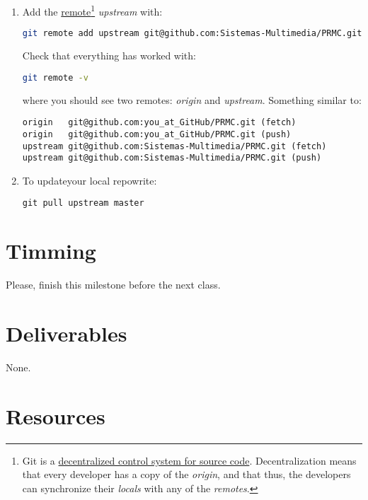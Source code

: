 \begin{enumerate}
\item Add the
  \href{https://docs.github.com/en/github/getting-started-with-github/github-glossary#remote}{remote}\footnote{Git
  is a
  \href{https://nvie.com/posts/a-successful-git-branching-model/}{decentralized
    control system for source code}. Decentralization means that every
  developer has a copy of the \emph{origin}, and that thus, the
  developers can synchronize their \emph{locals} with any of the
  \emph{remotes}.}  \emph{upstream} with:

  \begin{lstlisting}[language=bash]
    git remote add upstream git@github.com:Sistemas-Multimedia/PRMC.git
  \end{lstlisting}

  Check that everything has worked with:

  \begin{lstlisting}[language=bash]  
    git remote -v
  \end{lstlisting}

  where you should see two remotes: \emph{origin} and \emph{upstream}. Something similar to:

\begin{verbatim}
origin   git@github.com:you_at_GitHub/PRMC.git (fetch)
origin   git@github.com:you_at_GitHub/PRMC.git (push)
upstream git@github.com:Sistemas-Multimedia/PRMC.git (fetch)
upstream git@github.com:Sistemas-Multimedia/PRMC.git (push)
\end{verbatim}

\item To updateyour local repowrite:

\begin{verbatim}
git pull upstream master
\end{verbatim}

\end{enumerate}

\section{Timming}

Please, finish this milestone before the next class.

\section{Deliverables}

None.

\section{Resources}


